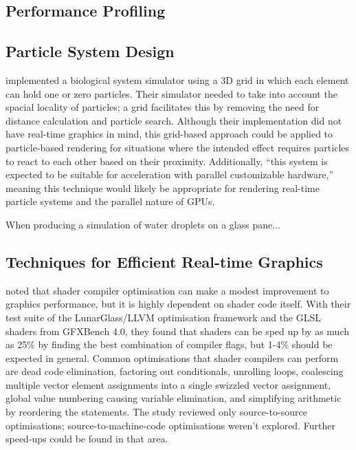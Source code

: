 \documentclass[11pt, a4paper, twocolumn]{article}
\begin{document}
\subsection{Performance Profiling}

\subsection{Particle System Design}


\citet{Boulianne2007} implemented a biological system simulator using a 3D grid in which each element can hold one or zero particles. Their simulator needed to take into account the spacial locality of particles; a grid facilitates this by removing the need for distance calculation and particle search. Although their implementation did not have real-time graphics in mind, this grid-based approach could be applied to particle-based rendering for situations where the intended effect requires particles to react to each other based on their proximity. Additionally, ``this system is expected to be suitable for acceleration with parallel customizable hardware,'' \citep{Boulianne2007} meaning this technique would likely be appropriate for rendering real-time particle systems and the parallel nature of GPUs.

When producing a simulation of water droplets on a glass pane... \citet{Chen2012}

\subsection{Techniques for Efficient Real-time Graphics}

\citet{Crawford2018} noted that shader compiler optimisation can make a modest improvement to graphics performance, but it is highly dependent on shader code itself. With their test suite of the LunarGlass/LLVM optimisation framework and the GLSL shaders from GFXBench 4.0, they found that shaders can be sped up by as much as 25\% by finding the best combination of compiler flags, but 1-4\% should be expected in general. Common optimisations that shader compilers can perform are dead code elimination, factoring out conditionals, unrolling loops, coalescing multiple vector element assignments into a single swizzled vector assignment, global value numbering causing variable elimination, and simplifying arithmetic by reordering the statements. The study reviewed only source-to-source optimisations; source-to-machine-code optimisations weren't explored. Further speed-ups could be found in that area.
\end{document}
